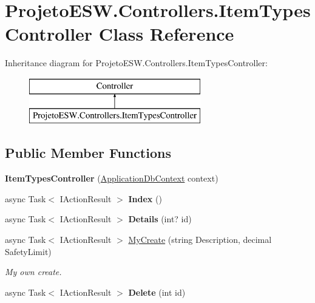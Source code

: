 \hypertarget{class_projeto_e_s_w_1_1_controllers_1_1_item_types_controller}{}\section{Projeto\+E\+S\+W.\+Controllers.\+Item\+Types\+Controller Class Reference}
\label{class_projeto_e_s_w_1_1_controllers_1_1_item_types_controller}
Inheritance diagram for Projeto\+E\+S\+W.\+Controllers.\+Item\+Types\+Controller\+:\begin{figure}[H]
\begin{center}
\leavevmode
\includegraphics[height=2.000000cm]{class_projeto_e_s_w_1_1_controllers_1_1_item_types_controller}
\end{center}
\end{figure}
\subsection*{Public Member Functions}
\begin{DoxyCompactItemize}
\item 
\mbox{\label{class_projeto_e_s_w_1_1_controllers_1_1_item_types_controller_a820dfead8aae2432a25629580f352e90}} 
{\bfseries Item\+Types\+Controller} (\mbox{\hyperlink{class_projeto_e_s_w_1_1_data_1_1_application_db_context}{Application\+Db\+Context}} context)
\item 
\mbox{\label{class_projeto_e_s_w_1_1_controllers_1_1_item_types_controller_a293f270775fc25c7382c4f69906e3bc4}} 
async Task$<$ I\+Action\+Result $>$ {\bfseries Index} ()
\item 
\mbox{\label{class_projeto_e_s_w_1_1_controllers_1_1_item_types_controller_a12764517f34a9348cb84482d779452a3}} 
async Task$<$ I\+Action\+Result $>$ {\bfseries Details} (int? id)
\item 
async Task$<$ I\+Action\+Result $>$ \mbox{\hyperlink{class_projeto_e_s_w_1_1_controllers_1_1_item_types_controller_a45e2aad98ceab787f05483c05173046b}{My\+Create}} (string Description, decimal Safety\+Limit)
\begin{DoxyCompactList}\small\item\em My own create.\end{DoxyCompactList}\item 
\mbox{\label{class_projeto_e_s_w_1_1_controllers_1_1_item_types_controller_a7d1a016a1786209595e213dc73cb2408}} 
async Task$<$ I\+Action\+Result $>$ {\bfseries Delete} (int id)
\end{DoxyCompactItemize}
